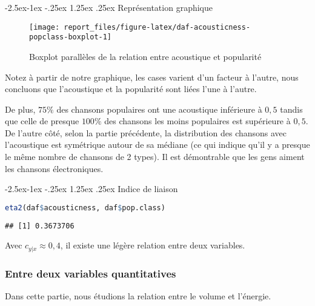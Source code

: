 \documentclass[
  11pt,
  xcolor = usenames,dvipsnames]{article}
\makeatletter
\renewcommand\paragraph{\@startsection{paragraph}{4}{\z@}%
        {-2.5ex\@plus -1ex \@minus -.25ex}%
        {1.25ex \@plus .25ex}%
        {\normalfont\normalsize\bfseries}}
\makeatother
\begin{document}
\hypertarget{repruxe9sentation-graphique}{%
\paragraph{Représentation graphique}\label{repruxe9sentation-graphique}}

\begin{figure}

{\centering \texttt{[image: report\_files/figure-latex/daf-acousticness-popclass-boxplot-1]} 

}

\caption{Boxplot parallèles de la relation entre acoustique et popularité}\label{fig:daf-acousticness-popclass-boxplot}
\end{figure}

Notez à partir de notre graphique, les cases varient d'un facteur à l'autre,
nous concluons que l'acoustique et la popularité sont liées l'une à l'autre.

De plus, \(75\%\) des chansons populaires ont une acoustique inférieure à \(0,5\) tandis que celle de presque \(100\%\) des chansons les moins populaires est supérieure à \(0,5\).
De l'autre côté, selon la partie précédente, la distribution des chansons avec l'acoustique est symétrique autour de sa médiane (ce qui indique qu'il y a presque le même nombre de chansons de 2 types).
Il est démontrable que les gens aiment les chansons électroniques.

\hypertarget{indice-de-liaison}{%
\paragraph{Indice de liaison}\label{indice-de-liaison}}

\begin{lstlisting}[language=R]
eta2(daf$acousticness, daf$pop.class)
\end{lstlisting}

\begin{lstlisting}
## [1] 0.3673706
\end{lstlisting}

Avec \(c_{y|x} \approx 0,4\), il existe une légère relation entre deux variables.

\hypertarget{volume-energy}{%
\subsubsection{Entre deux variables quantitatives}\label{volume-energy}}

Dans cette partie, nous étudions la relation entre le volume et l'énergie.
\end{document}
